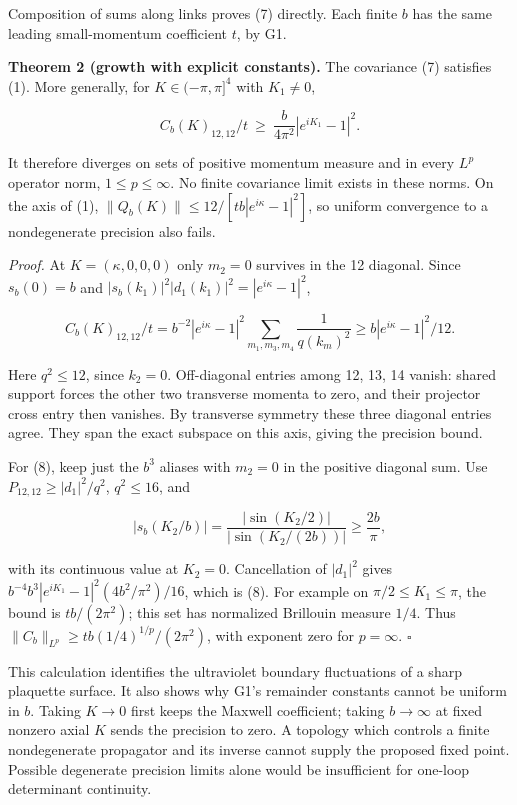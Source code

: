 \documentclass[11pt,a4paper]{article}
\begin{document}
Composition of sums along links proves (7) directly. Each finite \(b\)
has the same leading small-momentum coefficient \(t\), by G1.

\textbf{Theorem 2 (growth with explicit constants).} The covariance (7)
satisfies (1). More generally, for \(K\in(-\pi,\pi]^4\) with
\(K_1\ne0\),

\[C_b(K)_{12,12}/t\ \ge\ \frac{b}{4\pi^2}|e^{iK_1}-1|^2. \tag{8}\]

It therefore diverges on sets of positive momentum measure and in every
\(L^p\) operator norm, \(1\le p\le\infty\). No finite covariance limit
exists in these norms. On the axis of (1),
\(\|Q_b(K)\|\le12/[tb|e^{i\kappa}-1|^2]\), so uniform convergence to a
nondegenerate precision also fails.

\emph{Proof.} At \(K=(\kappa,0,0,0)\) only \(m_2=0\) survives in the 12
diagonal. Since \(s_b(0)=b\) and
\(|s_b(k_1)|^2|d_1(k_1)|^2=|e^{i\kappa}-1|^2\),

\[C_b(K)_{12,12}/t
 =b^{-2}|e^{i\kappa}-1|^2
 \sum_{m_1,m_3,m_4}\frac1{q(k_m)^2}
 \ge b|e^{i\kappa}-1|^2/12.\]

Here \(q^2\le12\), since \(k_2=0\). Off-diagonal entries among 12, 13,
14 vanish: shared support forces the other two transverse momenta to
zero, and their projector cross entry then vanishes. By transverse
symmetry these three diagonal entries agree. They span the exact
subspace on this axis, giving the precision bound.

For (8), keep just the \(b^3\) aliases with \(m_2=0\) in the positive
diagonal sum. Use \(P_{12,12}\ge |d_1|^2/q^2\), \(q^2\le16\), and

\[|s_b(K_2/b)|
 =\frac{|\sin(K_2/2)|}{|\sin(K_2/(2b))|}\ge\frac{2b}{\pi},\]

with its continuous value at \(K_2=0\). Cancellation of \(|d_1|^2\)
gives \(b^{-4}b^3|e^{iK_1}-1|^2(4b^2/\pi^2)/16\), which is (8). For
example on \(\pi/2\le K_1\le\pi\), the bound is \(tb/(2\pi^2)\); this
set has normalized Brillouin measure \(1/4\). Thus
\(\|C_b\|_{L^p}\ge tb(1/4)^{1/p}/(2\pi^2)\), with exponent zero for
\(p=\infty\). \(\square\)

This calculation identifies the ultraviolet boundary fluctuations of a
sharp plaquette surface. It also shows why G1's remainder constants
cannot be uniform in \(b\). Taking \(K\to0\) first keeps the Maxwell
coefficient; taking \(b\to\infty\) at fixed nonzero axial \(K\) sends
the precision to zero. A topology which controls a finite nondegenerate
propagator and its inverse cannot supply the proposed fixed point.
Possible degenerate precision limits alone would be insufficient for
one-loop determinant continuity.
\end{document}
